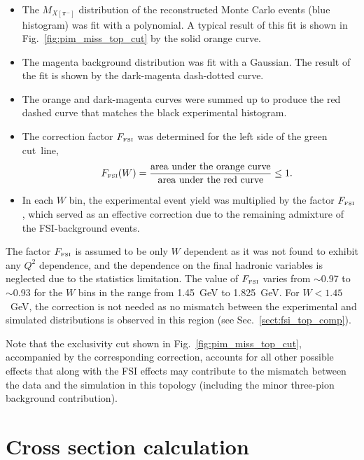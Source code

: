 \documentclass[prc,twocolumn,superscriptaddress,showpacs,amssymb,amsmath,amsfonts,aps,nofootinbib]{revtex4-1}
\begin{document}
\begin{itemize}
\item The $M_{X[\pi^{-}]}$ distribution of the reconstructed Monte Carlo events (blue histogram) was fit with a polynomial. A typical result of this fit is shown in Fig.\!~\ref{fig:pim_miss_top_cut} by the solid orange curve.
\item The magenta background distribution was fit with a Gaussian. The result of the fit is shown by the dark-magenta dash-dotted curve.
\item The orange and dark-magenta curves were summed up to produce the red dashed curve that matches the black experimental histogram.
\item The correction factor $F_{\text{\tiny FSI}}$ was determined for the left side of the green cut~line,
\begin{equation}
\begin{aligned}
~~~~F_{\text{\tiny FSI}}(W) = \frac{\text{area~under~the~orange~curve}}{\text{area~under~the~red~curve}} \leq 1.\label{eq:fsi_corr_fact}
\end{aligned}
\end{equation}
\item In each $W$ bin, the experimental event yield was multiplied by the factor $F_{\text{\tiny FSI}}$, which served as an effective correction due to the remaining admixture of the FSI-background events.
\end{itemize}




The factor $F_{\text{\tiny FSI}}$ is assumed to be only $W$ dependent as it was not found to exhibit any $Q^{2}$ dependence, and the dependence on the final hadronic variables is neglected due to the statistics limitation. The value of $F_{\text{\tiny FSI}}$ varies from $\sim$0.97 to $\sim$0.93 for the $W$ bins in the range from 1.45~GeV to 1.825~GeV. For $W < 1.45$~GeV, the correction is not needed as no mismatch between the experimental and simulated distributions is observed in this region (see Sec.\!~\ref{sect:fsi_top_comp}).


Note that the exclusivity cut shown in Fig.\!~\ref{fig:pim_miss_top_cut}, accompanied by the corresponding correction, accounts for all other possible effects that along with the FSI effects may contribute to the mismatch between the data and the simulation in this topology (including the minor three-pion background contribution).


\section{Cross section calculation}
\end{document}
